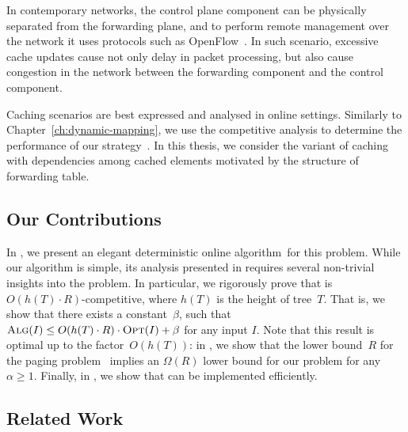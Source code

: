 In contemporary networks, the control plane component can be physically separated from the forwarding plane, and to perform remote management over the network it uses protocols such as OpenFlow~\cite{openflow}.
In such scenario, excessive cache updates cause not only delay in packet processing, but also cause congestion in the network between the forwarding component and the control component.

Caching scenarios are best expressed and analysed in online settings.
Similarly to Chapter~\ref{ch:dynamic-mapping}, we use the competitive analysis to determine the performance of our strategy~\cite{borodin-book}.
In this thesis, we consider the variant of caching with dependencies among cached elements motivated by the structure of forwarding table.


\subsection{Our Contributions}

%

In , we present an elegant deterministic online
algorithm~\ALG for this problem. While our algorithm is simple, its analysis
presented in  requires several non-trivial
insights into the problem. In particular, we rigorously prove that \ALG is
$O(h(T) \cdot R)$-competitive, where $h(T)$ is the height of tree~$T$. That
is, we show that there exists a constant~$\beta$, such that $\textsc{Alg}(I) \leq
O(h(T) \cdot R) \cdot \textsc{Opt}(I) + \beta$ for any input $I$. Note that this
result is optimal up to the factor~$O(h(T))$: in
, we show that the lower
bound~$R$ for the paging problem~\cite{competitive-analysis} implies an
$\Omega(R)$ lower bound for our problem for any $\alpha \geq 1$. Finally, in
, we show that \ALG can be
implemented efficiently.


\subsection{Related Work}

